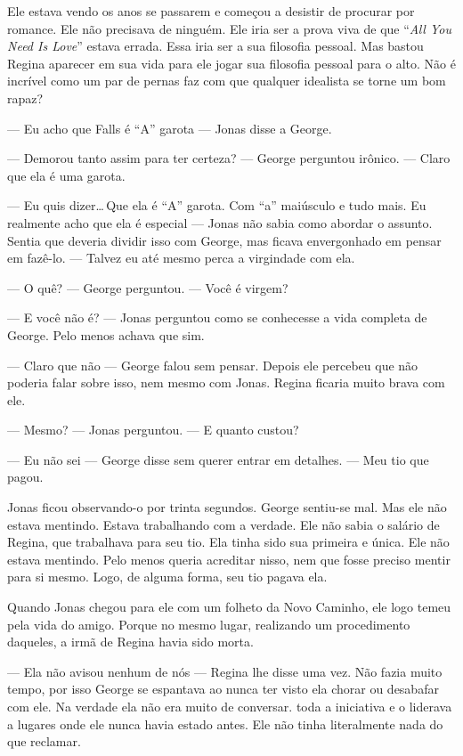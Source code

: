 Ele estava vendo os anos se passarem e começou a desistir de procurar por romance. Ele não precisava de ninguém. Ele iria ser a prova viva de que ``\emph{All You Need Is Love}'' estava errada. Essa iria ser a sua filosofia pessoal. Mas bastou Regina aparecer em sua vida para ele jogar sua filosofia pessoal para o alto. Não é incrível como um par de pernas faz com que qualquer idealista se torne um bom rapaz?

--- Eu acho que Falls é ``A'' garota --- Jonas disse a George.

--- Demorou tanto assim para ter certeza? --- George perguntou irônico. --- Claro que ela é uma garota.

--- Eu quis dizer\ldots\,Que ela é ``A'' garota. Com ``a'' maiúsculo e tudo mais. Eu realmente acho que ela é especial --- Jonas não sabia como abordar o assunto. Sentia que deveria dividir isso com George, mas ficava envergonhado em pensar em fazê-lo. --- Talvez eu até mesmo perca a virgindade com ela.

--- O quê? --- George perguntou. --- Você é virgem?

--- E você não é? --- Jonas perguntou como se conhecesse a vida completa de George. Pelo menos achava que sim.

--- Claro que não --- George falou sem pensar. Depois ele percebeu que não poderia falar sobre isso, nem mesmo com Jonas. Regina ficaria muito brava com ele.

--- Mesmo? --- Jonas perguntou. --- E quanto custou?

--- Eu não sei --- George disse\mudanca{,} sem querer entrar em detalhes. --- Meu tio que pagou.

Jonas ficou observando-o por trinta segundos. George sentiu-se mal. Mas ele não estava mentindo. Estava trabalhando com a verdade. Ele não sabia o salário de Regina, que trabalhava para seu tio. Ela tinha sido sua primeira e única. Ele não estava mentindo. Pelo menos queria acreditar nisso, nem que fosse preciso mentir para si mesmo. Logo, de alguma forma, seu tio pagava ela.

Quando Jonas chegou para ele com um folheto da Novo Caminho, ele logo temeu pela vida do amigo. Porque\mudanca{,} no mesmo lugar, realizando um procedimento daqueles, a irmã de Regina havia sido morta.

--- Ela não avisou nenhum de nós --- Regina lhe disse uma vez. Não fazia muito tempo, por isso George se espantava ao nunca ter visto ela chorar ou desabafar com ele. Na verdade\mudanca{,} ela não era muito de conversar.  toda a iniciativa e o liderava a lugares onde ele nunca havia estado antes. Ele não tinha literalmente nada do que reclamar.

